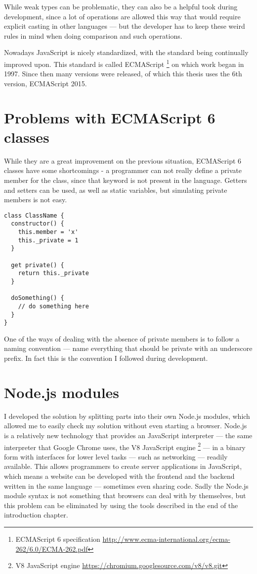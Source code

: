 While weak types can be problematic, they can also be a helpful took during development, since a lot of operations are allowed this way that would require explicit casting in other languages --- but the developer has to keep these weird rules in mind when doing comparison and such operations.

Nowadays JavaScript is nicely standardized, with the standard being continually improved upon. This standard is called ECMAScript \footnote{ECMAScript 6 specification \url{http://www.ecma-international.org/ecma-262/6.0/ECMA-262.pdf}} on which work began in 1997. Since then many versions were released, of which this thesis uses the 6th version, ECMAScript 2015.
\section{Problems with ECMAScript 6 classes}
While they are a great improvement on the previous situation, ECMAScript 6 classes have some shortcomings - a programmer can not really define a private member for the class, since that keyword is not present in the language. Getters and setters can be used, as well as static variables, but simulating private members is not easy.

\begin{lstlisting}[frame=single,float=!ht,caption="A typical class"]
class ClassName {
  constructor() {
    this.member = 'x'
    this._private = 1
  }
  
  get private() {
    return this._private
  }
  
  doSomething() {
    // do something here
  }
}
\end{lstlisting}

One of the ways of dealing with the absence of private members is to follow a naming convention --- name everything that should be private with an underscore prefix. In fact this is the convention I followed during development.
\section{Node.js modules}
I developed the solution by splitting parts into their own Node.js modules, which allowed me to easily check my solution without even starting a browser. Node.js is a relatively new technology that provides an JavaScript interpreter --- the same interpreter that Google Chrome uses, the V8 JavaScript engine \footnote{V8 JavaScript engine \url{https://chromium.googlesource.com/v8/v8.git}} --- in a binary form with interfaces for lower level tasks --- such as networking --- readily available. This allows programmers to create server applications in JavaScript, which means a website can be developed with the frontend and the backend written in the same language --- sometimes even sharing code. Sadly the Node.js module syntax is not something that browsers can deal with by themselves, but this problem can be eliminated by using the tools described in the end of the introduction chapter.